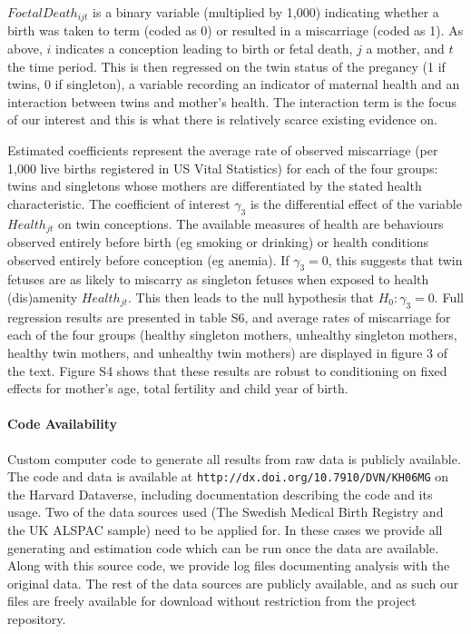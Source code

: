 \documentclass[11pt]{article}
\begin{document}
$FoetalDeath_{ijt}$ is a binary variable (multiplied by 1,000) indicating whether a birth was taken to term (coded as 0) or resulted in a miscarriage (coded as 1).  As above, $i$ indicates a conception leading to birth or fetal death, $j$ a mother, and $t$ the time period. This is then regressed on the twin status of the pregancy (1 if twins, 0 if singleton), a variable recording an indicator of maternal health and an interaction between twins and mother's health. The interaction term is the focus of our interest and this is what there is relatively scarce existing evidence on.

Estimated coefficients represent the average rate of observed miscarriage (per 1,000 live births registered in US Vital Statistics) for each of the four groups: twins and singletons whose mothers are differentiated by the stated health characteristic. The coefficient of interest $\gamma_3$ is the differential effect of the variable $Health_{jt}$ on twin conceptions. The available measures of health are behaviours observed entirely before birth (eg smoking or drinking) or health conditions observed entirely before conception (eg anemia). If $\gamma_3=0$, this suggests that twin fetuses are as likely to miscarry as singleton fetuses when exposed to health (dis)amenity $Health_{jt}$.  This then leads to the null hypothesis that $H_0: \gamma_3=0$. Full regression results are presented in table S6, and average rates of miscarriage for each of the four groups (healthy singleton mothers, unhealthy singleton mothers, healthy twin mothers, and unhealthy twin mothers) are displayed in figure 3 of the text. Figure S4 shows that these results are robust to conditioning on fixed effects for mother's age, total fertility and child year of birth.


\paragraph{Code Availability}
Custom computer code to generate all results from raw data is publicly available. The code and data is available at \texttt{http://dx.doi.org/10.7910/DVN/KH06MG} on the Harvard Dataverse, including documentation describing the code and its usage. Two of the data sources used (The Swedish Medical Birth Registry and the UK ALSPAC sample) need to be applied for. In these cases we provide all generating and estimation code which can be run once the data are available. Along with this source code, we provide log files documenting analysis with the original data.  The rest of the data sources are publicly available, and as such our files are freely available for download without restriction from the project repository.
\end{document}
